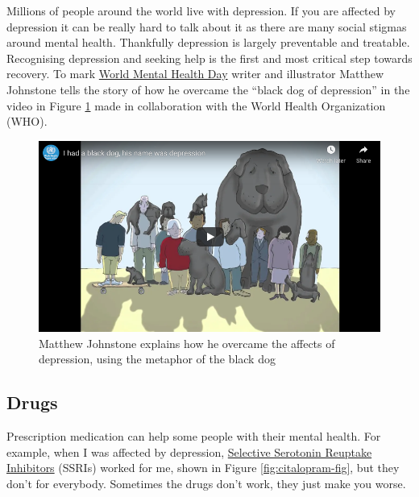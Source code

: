 \documentclass[
]{book}
\begin{document}
Millions of people around the world live with depression. If you are affected by depression it can be really hard to talk about it as there are many social stigmas around mental health. Thankfully depression is largely preventable and treatable. Recognising depression and seeking help is the first and most critical step towards recovery. To mark \href{https://en.wikipedia.org/wiki/World_Mental_Health_Day}{World Mental Health Day} writer and illustrator Matthew Johnstone tells the story of how he overcame the ``black dog of depression'' in the video in Figure \ref{fig:sad-fig} made in collaboration with the World Health Organization (WHO).

\begin{figure}

{\centering \includegraphics[width=0.99\linewidth]{images/youtube-blackdog} 

}

\caption{Matthew Johnstone explains how he overcame the affects of depression, using the metaphor of the black dog \citep{youtube-blackdog}}\label{fig:sad-fig}
\end{figure}



\hypertarget{drugs}{%
\subsection{Drugs}\label{drugs}}

Prescription medication can help some people with their mental health. For example, when I was affected by depression, \href{https://www.nhs.uk/conditions/ssri-antidepressants/}{Selective Serotonin Reuptake Inhibitors} (SSRIs) worked for me, shown in Figure \ref{fig:citalopram-fig}, but they don't for everybody. Sometimes the drugs don't work, they just make you worse. \citep{drugsdontwork}
\end{document}
